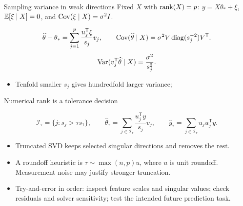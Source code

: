 \begin{frame}{Sampling variance in weak directions}
\small
Fixed $X$ with $\operatorname{rank}(X)=p$: $y=X\theta_*+\xi$, $\mathbb{E}[\xi\mid X]=0$,
and $\operatorname{Cov}(\xi\mid X)=\sigma^2I$.
\begin{definitionbox}
\[
 \widehat\theta-\theta_*
 =\sum_{j=1}^p\frac{u_j^{\mathsf T}\xi}{s_j}v_j,
 \qquad \operatorname{Cov}(\widehat\theta\mid X)
 =\sigma^2 V\operatorname{diag}(s_j^{-2})V^{\mathsf T}.
\]
\[
 \operatorname{Var}(v_j^{\mathsf T}\widehat\theta\mid X)=\frac{\sigma^2}{s_j^2}.
\]
\end{definitionbox}
\small
\begin{itemize}\setlength{\itemsep}{5pt}
\item Tenfold smaller $s_j$ gives hundredfold larger variance; 
\end{itemize}
\end{frame}


\begin{frame}{Numerical rank is a tolerance decision}
\begin{definitionbox}
\[
 \mathcal I_\tau=\{j:s_j>\tau s_1\},\qquad
 \widehat\theta_\tau=\sum_{j\in\mathcal I_\tau}
       \frac{u_j^{\mathsf T}y}{s_j}v_j,
 \qquad
 \widehat y_\tau=\sum_{j\in\mathcal I_\tau}u_j u_j^{\mathsf T}y.
\]
\end{definitionbox}
\small
\begin{itemize}\setlength{\itemsep}{7pt}
\item Truncated SVD keeps selected singular directions and removes the rest.
\item A roundoff heuristic is $\tau\sim\max(n,p)u$, where $u$ is unit roundoff. Measurement noise may justify stronger truncation.
\item Try-and-error in order: inspect feature scales and singular values; check residuals and solver sensitivity; test the intended future prediction task.
\end{itemize}
\end{frame}


